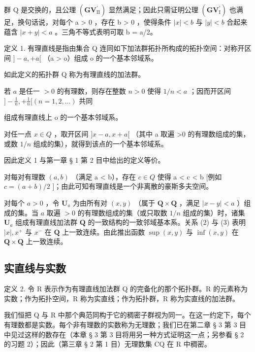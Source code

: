 群 Q 是交换的，且公理 \((\mathbf{GV}_{\mathrm{II}}^{\prime})\) 显然满足；因此只需证明公理 \((\mathbf{GV}_{\mathrm{I}}^{\prime})\) 也满足，换句话说，对每个 a \textgreater{} 0 ，存在 b \textgreater{} 0 ，使得条件 \(|x| < b\) 与 \(|y| < b\) 合起来蕴含 \(|x + y| < a\) 。三角不等式表明可取 b = a/2。

定义 1. 有理直线是指由集合 Q 连同如下加法群拓扑所构成的拓扑空间：对称开区间 \(]-a, +a[\) （a \textgreater{} o）组成 o 的一个基本邻域系。

如此定义的拓扑群 Q 称为有理直线的加法群。

若 \(a\) 是任一 \(> 0\) 的有理数，则存在整数 \(n > 0\) 使得 \(1 / n < a\) ；因而开区间 \(] - \frac{1}{n}, + \frac{1}{n} [ (n = 1, 2, \ldots) \text{ 共同}\)

组成有理直线上 o 的一个基本邻域系。

对任一点 \(x \in Q\) ，取开区间 \(]x - a, x + a[\) （其中 a 取遍 \textgreater0 的有理数组成的集，或数 \(1/n\) 组成的集），就得到该点的一个基本邻域系。

因此定义 1 与第一章 § 1 第 2 目中给出的定义等价。

对每对有理数 \((a, b)\) （满足 a \textless{} b），存在 \(c \in Q\) 使得 a \textless{} c \textless{} b {[}例如 \(c = (a + b)/2\) {]}；由此可知有理直线是一个非离散的豪斯多夫空间。

对每个 \(a > 0\) ，令 \(\mathbf{U}_a\) 为由所有对 \((x, y)\) （属于 \(\mathbf{Q} \times \mathbf{Q}\) ，满足 \(|x - y| < a\) ）组成的集。当 \(a\) 取遍 \(> 0\) 的有理数组成的集（或只取数 \(1/n\) 组成的集）时，诸集 \(\mathbf{U}_a\) 组成有理直线加法群 \(\mathbf{Q}\) 的一致结构的一致邻域基本系。关系 (2) 与 (3) 表明 \(|x|, x^+\) 与 \(x^-\) 在 \(\mathbf{Q}\) 上一致连续。由此推出函数 \(\sup (x, y)\) 与 \(\inf (x, y)\) 在 \(\mathbf{Q} \times \mathbf{Q}\) 上一致连续。

\subsection{实直线与实数}

定义 2. 令 R 表示作为有理直线加法群 Q 的完备化的那个拓扑群。R 的元素称为实数；作为拓扑空间，R 称为实直线；作为拓扑群，R 称为实直线的加法群。

我们恒把 Q 与 R 中那个典范同构于它的稠密子群视为同一。在这一约定下，每个有理数都是实数。每个非有理数的实数称为无理数；我们已在第二章 § 3 第 3 目中见过这样的数存在（本章 § 3 第 3 目将用另一种方式证明这一点；另参看 § 2 的习题 2）；因此（第三章 § 2 第 1 目）无理数集 CQ 在 R 中稠密。

